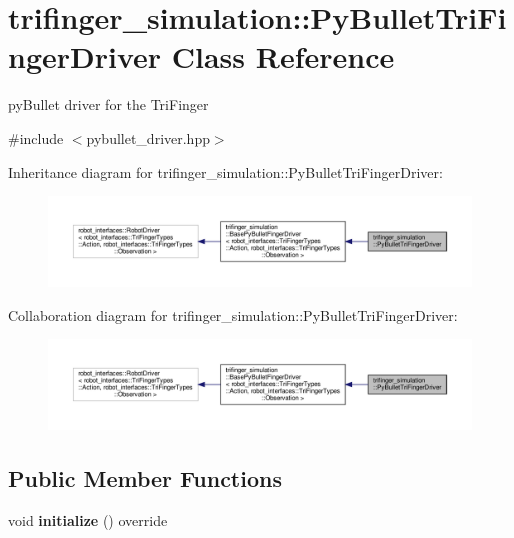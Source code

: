 \hypertarget{classtrifinger__simulation_1_1PyBulletTriFingerDriver}{}\section{trifinger\+\_\+simulation\+:\+:Py\+Bullet\+Tri\+Finger\+Driver Class Reference}
\label{classtrifinger__simulation_1_1PyBulletTriFingerDriver}


py\+Bullet driver for the Tri\+Finger  




{\ttfamily \#include $<$pybullet\+\_\+driver.\+hpp$>$}



Inheritance diagram for trifinger\+\_\+simulation\+:\+:Py\+Bullet\+Tri\+Finger\+Driver\+:
\nopagebreak
\begin{figure}[H]
\begin{center}
\leavevmode
\includegraphics[width=350pt]{classtrifinger__simulation_1_1PyBulletTriFingerDriver__inherit__graph}
\end{center}
\end{figure}


Collaboration diagram for trifinger\+\_\+simulation\+:\+:Py\+Bullet\+Tri\+Finger\+Driver\+:
\nopagebreak
\begin{figure}[H]
\begin{center}
\leavevmode
\includegraphics[width=350pt]{classtrifinger__simulation_1_1PyBulletTriFingerDriver__coll__graph}
\end{center}
\end{figure}
\subsection*{Public Member Functions}
\begin{DoxyCompactItemize}
\item 
\mbox{\label{classtrifinger__simulation_1_1PyBulletTriFingerDriver_a15f298c6ccf4ac825880e801b3c4db2c}} 
void {\bfseries initialize} () override
\end{DoxyCompactItemize}
